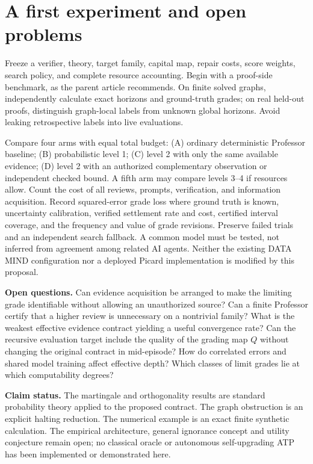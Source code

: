 \documentclass[11pt,letterpaper]{article}
\theoremstyle{definition}\newtheorem{definition}[theorem]{Definition}\newtheorem{example}[theorem]{Example}\newtheorem{conjecture}[theorem]{Conjecture}
\begin{document}
\section{A first experiment and open problems}
Freeze a verifier, theory, target family, capital map, repair costs, score weights, search policy, and complete resource accounting. Begin with a proof-side benchmark, as the parent article recommends. On finite solved graphs, independently calculate exact horizons and ground-truth grades; on real held-out proofs, distinguish graph-local labels from unknown global horizons. Avoid leaking retrospective labels into live evaluations.

Compare four arms with equal total budget: (A) ordinary deterministic Professor baseline; (B) probabilistic level 1; (C) level 2 with only the same available evidence; (D) level 2 with an authorized complementary observation or independent checked bound. A fifth arm may compare levels 3--4 if resources allow. Count the cost of all reviews, prompts, verification, and information acquisition. Record squared-error grade loss where ground truth is known, uncertainty calibration, verified settlement rate and cost, certified interval coverage, and the frequency and value of grade revisions. Preserve failed trials and an independent search fallback. A common model must be tested, not inferred from agreement among related AI agents. Neither the existing DATA MIND configuration nor a deployed Picard implementation is modified by this proposal.

\textbf{Open questions.} Can evidence acquisition be arranged to make the limiting grade identifiable without allowing an unauthorized source? Can a finite Professor certify that a higher review is unnecessary on a nontrivial family? What is the weakest effective evidence contract yielding a useful convergence rate? Can the recursive evaluation target include the quality of the grading map $Q$ without changing the original contract in mid-episode? How do correlated errors and shared model training affect effective depth? Which classes of limit grades lie at which computability degrees?

\textbf{Claim status.} The martingale and orthogonality results are standard probability theory applied to the proposed contract. The graph obstruction is an explicit halting reduction. The numerical example is an exact finite synthetic calculation. The empirical architecture, general ignorance concept and utility conjecture remain open; no classical oracle or autonomous self-upgrading ATP has been implemented or demonstrated here.
\end{document}
